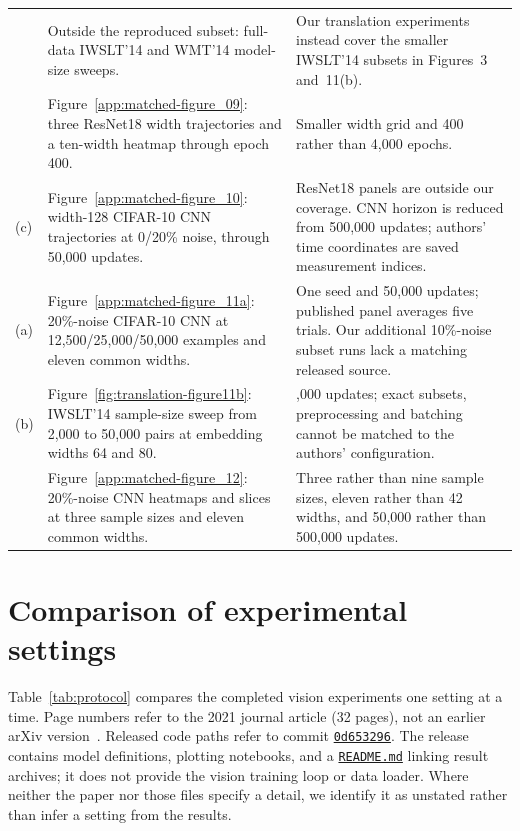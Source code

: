 \documentclass{article}
\begin{document}
\begin{longtable}{@{}>{\raggedright\arraybackslash}p{}>{\raggedright\arraybackslash}p{}>{\raggedright\arraybackslash}p{}@{}}
8 & Outside the reproduced subset: full-data IWSLT'14 and WMT'14 model-size sweeps. & Our translation experiments instead cover the smaller IWSLT'14 subsets in Figures~3 and~11(b).\\
9 & Figure~\ref{app:matched-figure_09}: three ResNet18 width trajectories and a ten-width heatmap through epoch 400. & Smaller width grid and 400 rather than 4,000 epochs.\\
10(c) & Figure~\ref{app:matched-figure_10}: width-128 CIFAR-10 CNN trajectories at 0/20\% noise, through 50,000 updates. & ResNet18 panels are outside our coverage. CNN horizon is reduced from 500,000 updates; authors' time coordinates are saved measurement indices.\\
11(a) & Figure~\ref{app:matched-figure_11a}: 20\%-noise CIFAR-10 CNN at 12,500/25,000/50,000 examples and eleven common widths. & One seed and 50,000 updates; published panel averages five trials. Our additional 10\%-noise subset runs lack a matching released source.\\
11(b) & Figure~\ref{fig:translation-figure11b}: IWSLT'14 sample-size sweep from 2,000 to 50,000 pairs at embedding widths 64 and 80. & 80,000 updates; exact subsets, preprocessing and batching cannot be matched to the authors' configuration.\\
12 & Figure~\ref{app:matched-figure_12}: 20\%-noise CNN heatmaps and slices at three sample sizes and eleven common widths. & Three rather than nine sample sizes, eleven rather than 42 widths, and 50,000 rather than 500,000 updates.\\
\end{longtable}
\clearpage

\section{Comparison of experimental settings}\label{app:protocol}
Table~\ref{tab:protocol} compares the completed vision experiments one
setting at a time. Page numbers refer to the 2021 journal article
(32 pages), not an earlier arXiv version~\cite{nakkiran2021deepdouble}.
Released code paths refer to commit
\href{https://gitlab.com/harvard-machine-learning/double-descent/-/tree/0d653296f870e6bf7ee82dc71b4f7b49d53fa85d}{\texttt{0d653296}}.
The release contains model definitions, plotting notebooks, and a
\href{https://gitlab.com/harvard-machine-learning/double-descent/-/blob/0d653296f870e6bf7ee82dc71b4f7b49d53fa85d/README.md}{\texttt{README.md}}
linking result archives; it does not provide the vision training loop or
data loader. Where neither the paper nor those files specify a detail,
we identify it as unstated rather than infer a setting from the results.
\end{document}
